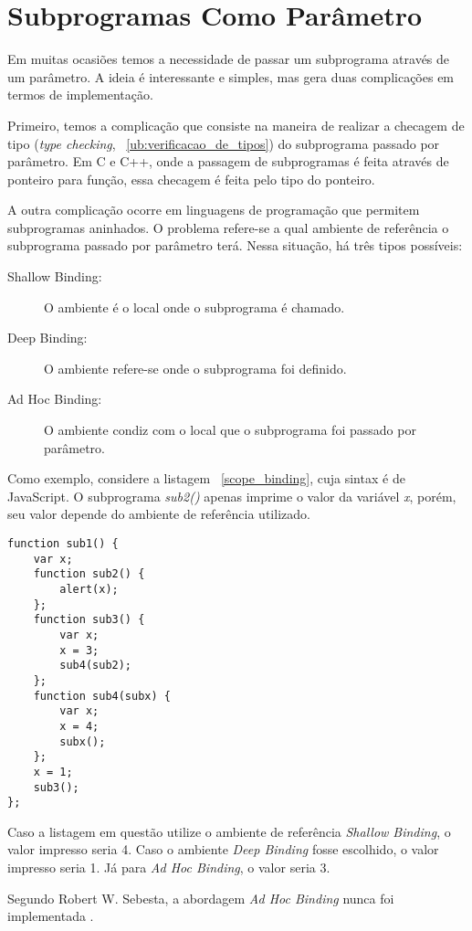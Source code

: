 
\section{Subprogramas Como Parâmetro} %
\label{sec:subprogramas_como_parametro}
Em muitas ocasiões temos a necessidade de passar um subprograma através de um parâmetro. A ideia é interessante e simples, mas gera duas complicações em termos de implementação.

Primeiro, temos a complicação que consiste na maneira de realizar a checagem de tipo (\textit{type checking}, ~\ref{ub:verificacao_de_tipos}) do subprograma passado por parâmetro. Em C e C++, onde a passagem de subprogramas é feita através de ponteiro para função, essa checagem é feita pelo tipo do ponteiro.

A outra complicação ocorre em linguagens de programação que permitem subprogramas aninhados. O problema refere-se a qual ambiente de referência o subprograma passado por parâmetro terá. Nessa situação, há três tipos possíveis:
\begin{description}
	\item[Shallow Binding:] O ambiente é o local onde o subprograma é chamado.
	\item[Deep Binding:] O ambiente refere-se onde o subprograma foi definido.
	\item[Ad Hoc Binding:] O ambiente condiz com o local que o subprograma foi passado por parâmetro.
\end{description}

Como exemplo, considere a listagem ~\ref{scope_binding}, cuja sintax é de JavaScript. O subprograma \textit{sub2()} apenas imprime o valor da variável \textit{x}, porém, seu valor depende do ambiente de referência utilizado. 

\begin{lstlisting}[caption=Código retirado de \cite{sebesta}]
function sub1() {
	var x;
	function sub2() {
		alert(x);
	};
	function sub3() {
		var x;
		x = 3;
		sub4(sub2);
	};
	function sub4(subx) {
		var x;
		x = 4;
		subx();
	};
	x = 1;
	sub3();
};
\end{lstlisting}
\label{scope_binding}

Caso a listagem em questão utilize o ambiente de referência \textit{Shallow Binding}, o valor impresso seria 4. Caso o ambiente \textit{Deep Binding} fosse escolhido, o valor impresso seria 1. Já para \textit{Ad Hoc Binding}, o valor seria 3.

Segundo Robert W. Sebesta, a abordagem \textit{Ad Hoc Binding} nunca foi implementada \cite{sebesta}.
